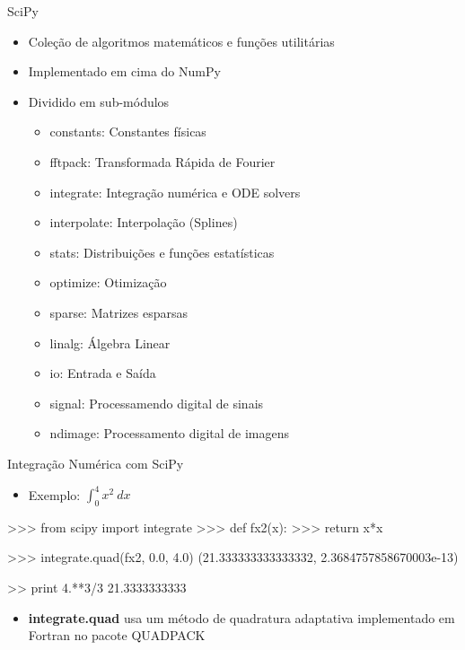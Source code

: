 \documentclass[12pt,t,graphics]{beamer}
\begin{document}
\begin{frame}[t,fragile]{SciPy}
	\begin{itemize}
		\item Coleção de algoritmos matemáticos e funções utilitárias
		\item Implementado em cima do NumPy
		\item Dividido em sub-módulos
		\begin{itemize}
			\item constants: Constantes físicas
			\item fftpack: Transformada Rápida de Fourier
			\item integrate: Integração numérica e ODE solvers
			\item interpolate: Interpolação (Splines)
			\item stats: Distribuições e funções estatísticas
			\item optimize: Otimização
			\item sparse: Matrizes esparsas
			\item linalg: Álgebra Linear
			\item io: Entrada e Saída
			\item signal: Processamendo digital de sinais
			\item ndimage: Processamento digital de imagens
		\end{itemize}
	\end{itemize}
\end{frame}

\begin{frame}[t,fragile]{Integração Numérica com SciPy}
	\begin{itemize}
		\item Exemplo: $\displaystyle\int_{0}^{4} x^2 \ dx$ 
	\end{itemize}
	\begin{python}
	>>> from scipy import integrate
	>>> def fx2(x):
	>>>     return x*x
	
	>>> integrate.quad(fx2, 0.0, 4.0)
	(21.333333333333332, 2.3684757858670003e-13)
	
	>> print 4.**3/3
	21.3333333333
	\end{python}
	\begin{itemize}
		\item \textbf{integrate.quad} usa um método de quadratura adaptativa
		implementado em Fortran no pacote QUADPACK
	\end{itemize}
	
\end{frame}
\end{document}
